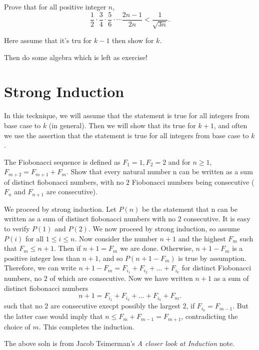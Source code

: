 \begin{example}
Prove that for all positive integer \(n\), 
\[ \frac{1}{2} \cdot  \frac{3}{4} \cdot  \frac{5}{6} \cdot \cdots  \frac{2n-1}{2n} < \frac{1}{\sqrt{3n}} .\]
\end{example}

\begin{soln}
Here assume that it's tru for $k-1$ then show for $k$.

Then do some algebra which is left as exercise!
\end{soln}


\section{Strong Induction}
In this tecknique, we will assume that the statement is true for all integers from base case to \(k\) (in general).
Then we will show that its true for \(k+1\), and often we use the assertion that the statement is true for all integers from base case to \(k\).

\begin{example}
The Fiobonacci sequence is defined as $F_1 = 1, F_2 = 2$ and for $n \ge 1$,
$F_{m+2} = F_{m+1} + F_m$. Show that every natural number n can be written as a sum of distinct
fiobonacci numbers, with no $2$ Fiobonacci numbers being consecutive ($F_n$ and $F_{n+1}$ are
consecutive).
\end{example}
\begin{soln}
We proceed by strong induction. Let $P(n)$ be the statement that n can be written
as a sum of distinct fiobonacci numbers with no $2$ consecutive. It is easy to verify $P(1)$
and $P(2)$. We now proceed by strong induction, so assume $P(i)$ for all $1 \le i \le n$. Now
consider the number $n + 1$ and the highest $F_m$ such that $F_m \le n + 1$. Then if $n + 1 = F_m$ we are done.
Otherwise, $n + 1 - F_m$ is a positive integer less than $n + 1$, and so $P(n + 1 - F_m)$ is
true by assumption. Therefore, we can write $n + 1 - F_m = F_{i_1} + F_{i_2} + \dots + F_{i_k}$ for distinct Fiobonacci numbers, no $2$ of which are consecutive. Now we have written $n + 1$ as a sum of distinct fiobonacci numbers
\[ n + 1 = F_{i_1} + F_{i_2} + \ldots + F_{i_k} + F_m.\]
such that no $2$ are consecutive execpt possibly the largest $2$, if $F_{i_k} = F_{m-1}$. But the latter case would imply that $n \le F_m + F_{m-1} = F_{m+1}$, contradicting the choice of $m$. This completes the induction.
\end{soln}
The above soln is from Jacob Tsimerman's \textit{A closer look at Induction} note.




